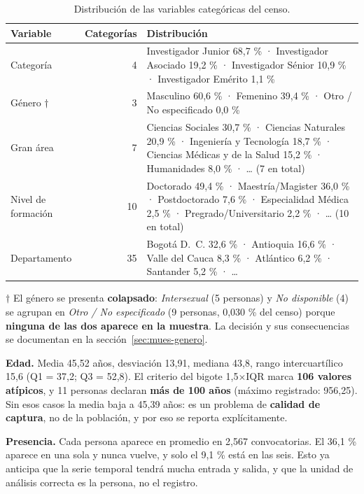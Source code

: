 \begin{table}[H]
  \centering
  \small
  \caption{Distribución de las variables categóricas del censo.}
  \label{tab:mues-univariado}
  \begin{tabular}{@{}lrl@{}}
    \toprule
    \textbf{Variable} & \textbf{Categorías} & \textbf{Distribución} \\
    \midrule
    Categoría & 4 & Investigador Junior 68,7 \% · Investigador Asociado 19,2 \% ·
        Investigador Sénior 10,9 \% · Investigador Emérito 1,1 \% \\
    Género $\dagger$ & 3 & Masculino 60,6 \% · Femenino 39,4 \% ·
        Otro / No especificado 0,0 \% \\
    Gran área & 7 & Ciencias Sociales 30,7 \% · Ciencias Naturales 20,9 \% ·
        Ingeniería y Tecnología 18,7 \% · Ciencias Médicas y de la Salud 15,2 \% ·
        Humanidades 8,0 \% · \dots{} (7 en total) \\
    Nivel de formación & 10 & Doctorado 49,4 \% · Maestría/Magister 36,0 \% ·
        Postdoctorado 7,6 \% · Especialidad Médica 2,5 \% · Pregrado/Universitario
        2,2 \% · \dots{} (10 en total) \\
    Departamento & 35 & Bogotá D.~C. 32,6 \% · Antioquia 16,6 \% · Valle del
        Cauca 8,3 \% · Atlántico 6,2 \% · Santander 5,2 \% · \dots \\
    \bottomrule
  \end{tabular}

  \smallskip
  {\footnotesize $\dagger$ El género se presenta \textbf{colapsado}:
  \emph{Intersexual} (5 personas) y \emph{No disponible} (4) se agrupan en
  \emph{Otro / No especificado} (9 personas, 0,030 \% del censo) porque
  \textbf{ninguna de las dos aparece en la muestra}. La decisión y sus
  consecuencias se documentan en la
  sección~\ref{sec:mues-genero}.}
\end{table}

\textbf{Edad.} Media 45,52 años, desviación 13,91, mediana 43,8, rango
intercuartílico 15,6 (Q1 = 37,2; Q3 = 52,8). El criterio del bigote
1,5$\times$IQR marca \textbf{106 valores atípicos}, y 11 personas declaran
\textbf{más de 100 años} (máximo registrado: 956,25). Sin esos casos la media
baja a 45,39 años: es un problema de \textbf{calidad de captura}, no de la
población, y por eso se reporta explícitamente.

\textbf{Presencia.} Cada persona aparece en promedio en 2,567 convocatorias. El
36,1 \% aparece en una sola y nunca vuelve, y solo el 9,1 \% está en las seis.
Esto ya anticipa que la serie temporal tendrá mucha entrada y salida, y que la
unidad de análisis correcta es la persona, no el registro.

